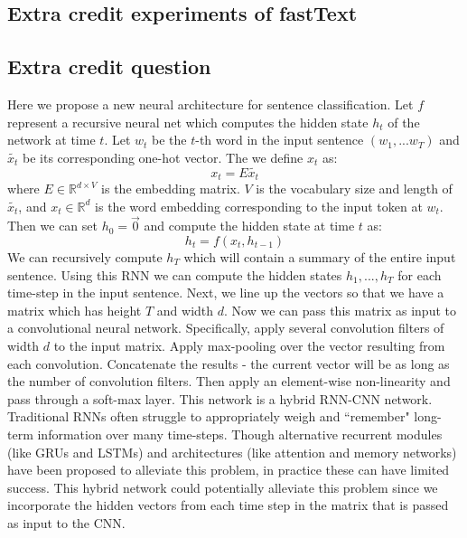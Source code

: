 \documentclass[a4paper]{article}
\begin{document}
\subsection{Extra credit experiments of fastText}

\subsection{Extra credit question}
Here we propose a new neural architecture for sentence classification. Let $f$ represent a recursive neural net which computes the hidden state $h_t$ of the network at time $t$. Let $w_t$ be the $t$-th word in the input sentence $(w_1,...w_T)$ and $\tilde{x_t}$ be its corresponding one-hot vector. The we define $x_t$ as:
$$x_t = E \tilde{x_t} $$
where $E \in \mathbb{R}^{d \times V}$ is the embedding matrix. $V$ is the vocabulary size and length of $\tilde{x_t}$, and $x_t \in \mathbb{R}^d$ is the word embedding corresponding to the input token at $w_t$. 
\newline
\newline
Then we can set $h_0 = \vec{0}$ and compute the hidden state at time $t$ as:
$$h_t = f(x_t, h_{t-1}) $$ 
We can recursively compute $h_T$ which will contain a summary of the entire input sentence.
\newline
\newline
Using this RNN we can compute the hidden states $h_1,...,h_{T}$ for each time-step in the input sentence. Next, we line up the vectors so that we have a matrix which has height $T$ and width $d$. 
\newline
\newline
Now we can pass this matrix as input to a convolutional neural network. Specifically, apply several convolution filters of width $d$ to the input matrix. Apply max-pooling over the vector resulting from each convolution. Concatenate the results - the current vector will be as long as the number of convolution filters. Then apply an element-wise non-linearity and pass through a soft-max layer. 
\newline
\newline
This network is a hybrid RNN-CNN network. Traditional RNNs often struggle to appropriately weigh and ``remember" long-term information over many time-steps. Though alternative recurrent modules (like GRUs and LSTMs) and architectures (like attention and memory networks) have been proposed to alleviate this problem, in practice these can have limited success. This hybrid network could potentially alleviate this problem since we incorporate the hidden vectors from each time step in the matrix that is passed as input to the CNN. 
\end{document}
